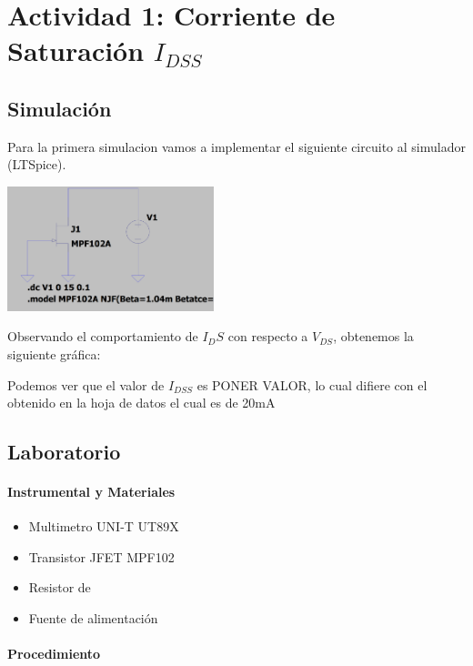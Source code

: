 \section{Actividad 1: Corriente de Saturación $I_{DSS}$}

\subsection{Simulación}

Para la primera simulacion vamos a implementar el siguiente circuito al simulador (LTSpice).

\includegraphics[width=6cm]{./imagenes/Circ1.png}

Observando el comportamiento de $I_DS$ con respecto a $V_{DS}$, obtenemos la siguiente gráfica:


Podemos ver que el valor de $I_{DSS}$ es PONER VALOR, lo cual difiere con el obtenido en la hoja de datos el cual es de 20mA

\subsection{Laboratorio}

\paragraph{Instrumental y Materiales}
\begin{itemize}
    \item Multimetro UNI-T UT89X
    \item Transistor JFET MPF102
    \item Resistor de
    \item Fuente de alimentación
\end{itemize}

\paragraph{Procedimiento}